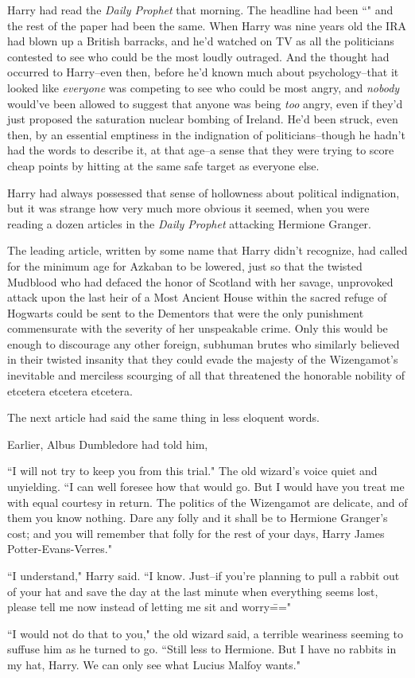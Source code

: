 Harry had read the \emph{Daily Prophet} that morning. The headline had been ``" and the rest of the paper had been the same. When Harry was nine years old the IRA had blown up a British barracks, and he'd watched on TV as all the politicians contested to see who could be the most loudly outraged. And the thought had occurred to Harry\---even then, before he'd known much about psychology\---that it looked like \emph{everyone} was competing to see who could be most angry, and \emph{nobody} would've been allowed to suggest that anyone was being \emph{too} angry, even if they'd just proposed the saturation nuclear bombing of Ireland. He'd been struck, even then, by an essential emptiness in the indignation of politicians\---though he hadn't had the words to describe it, at that age\---a sense that they were trying to score cheap points by hitting at the same safe target as everyone else.

Harry had always possessed that sense of hollowness about political indignation, but it was strange how very much more obvious it seemed, when you were reading a dozen articles in the \emph{Daily Prophet} attacking Hermione Granger.

The leading article, written by some name that Harry didn't recognize, had called for the minimum age for Azkaban to be lowered, just so that the twisted Mudblood who had defaced the honor of Scotland with her savage, unprovoked attack upon the last heir of a Most Ancient House within the sacred refuge of Hogwarts could be sent to the Dementors that were the only punishment commensurate with the severity of her unspeakable crime. Only this would be enough to discourage any other foreign, subhuman brutes who similarly believed in their twisted insanity that they could evade the majesty of the Wizengamot's inevitable and merciless scourging of all that threatened the honorable nobility of etcetera etcetera etcetera.

The next article had said the same thing in less eloquent words.

Earlier, Albus Dumbledore had told him,

\begin{em}
``I will not try to keep you from this trial." The old wizard's voice quiet and unyielding. ``I can well foresee how that would go. But I would have you treat me with equal courtesy in return. The politics of the Wizengamot are delicate, and of them you know nothing. Dare any folly and it shall be to Hermione Granger's cost; and you will remember that folly for the rest of your days, Harry James Potter-Evans-Verres."

``I understand," Harry said. ``I know. Just\---if you're planning to pull a rabbit out of your hat and save the day at the last minute when everything seems lost, please tell me now instead of letting me sit and worry\==="

``I would not do that to you," the old wizard said, a terrible weariness seeming to suffuse him as he turned to go. ``Still less to Hermione. But I have no rabbits in my hat, Harry. We can only see what Lucius Malfoy wants."
\end{em}

